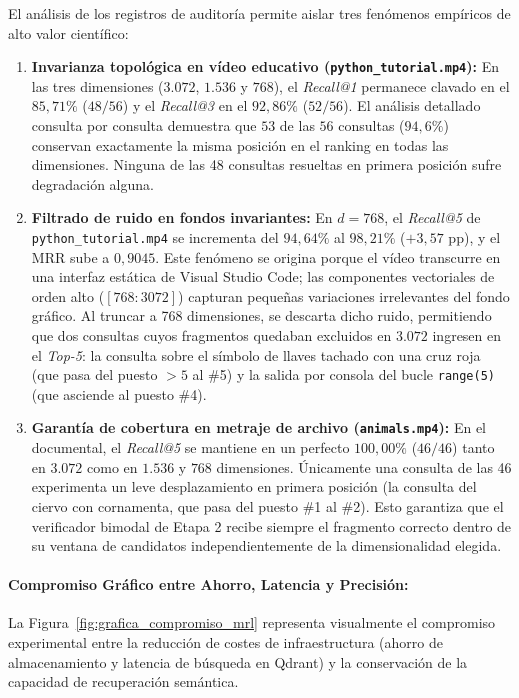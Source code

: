 El análisis de los registros de auditoría permite aislar tres fenómenos empíricos de alto valor científico:
\begin{enumerate}
    \item \textbf{Invarianza topológica en vídeo educativo (\texttt{python\_tutorial.mp4}):} En las tres dimensiones ($3.072$, $1.536$ y $768$), el \textit{Recall@1} permanece clavado en el $85,71\%$ ($48/56$) y el \textit{Recall@3} en el $92,86\%$ ($52/56$). El análisis detallado consulta por consulta demuestra que $53$ de las $56$ consultas ($94,6\%$) conservan exactamente la misma posición en el ranking en todas las dimensiones. Ninguna de las 48 consultas resueltas en primera posición sufre degradación alguna.
    \item \textbf{Filtrado de ruido en fondos invariantes:} En $d = 768$, el \textit{Recall@5} de \texttt{python\_tutorial.mp4} se incrementa del $94,64\%$ al $98,21\%$ ($+3,57\text{ pp}$), y el MRR sube a $0,9045$. Este fenómeno se origina porque el vídeo transcurre en una interfaz estática de Visual Studio Code; las componentes vectoriales de orden alto ($[768:3072]$) capturan pequeñas variaciones irrelevantes del fondo gráfico. Al truncar a 768 dimensiones, se descarta dicho ruido, permitiendo que dos consultas cuyos fragmentos quedaban excluidos en $3.072$ ingresen en el \textit{Top-5}: la consulta sobre el símbolo de llaves tachado con una cruz roja (que pasa del puesto $>5$ al \#5) y la salida por consola del bucle \texttt{range(5)} (que asciende al puesto \#4).
    \item \textbf{Garantía de cobertura en metraje de archivo (\texttt{animals.mp4}):} En el documental, el \textit{Recall@5} se mantiene en un perfecto $100,00\%$ ($46/46$) tanto en $3.072$ como en $1.536$ y $768$ dimensiones. Únicamente una consulta de las 46 experimenta un leve desplazamiento en primera posición (la consulta del ciervo con cornamenta, que pasa del puesto \#1 al \#2). Esto garantiza que el verificador bimodal de Etapa 2 recibe siempre el fragmento correcto dentro de su ventana de candidatos independientemente de la dimensionalidad elegida.
\end{enumerate}

\paragraph{Compromiso Gráfico entre Ahorro, Latencia y Precisión:}
La Figura~\ref{fig:grafica_compromiso_mrl} representa visualmente el compromiso experimental entre la reducción de costes de infraestructura (ahorro de almacenamiento y latencia de búsqueda en Qdrant) y la conservación de la capacidad de recuperación semántica.

